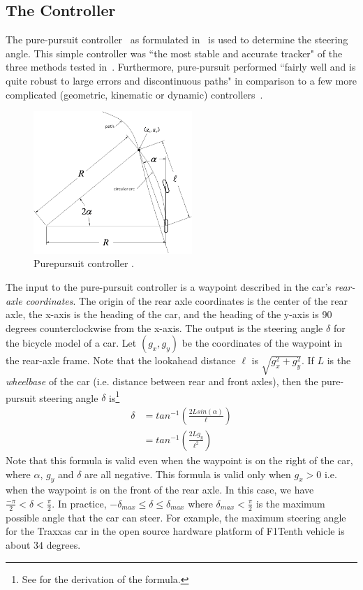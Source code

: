 \subsection{The Controller}
\label{sec:ppcontroller}
The pure-pursuit controller~\cite{Amidi.1991}
as formulated in~\cite{Snider.2009} is used to determine the steering angle.
This simple controller was ``the most stable and accurate tracker"
of the three methods tested in~\cite{Amidi.1991}.
Furthermore, pure-pursuit performed
``fairly well and is quite robust to large errors and discontinuous paths" in comparison to a few more complicated (geometric, kinematic or dynamic) controllers~\cite{Snider.2009}.

\begin{figure}
\centering
\includegraphics[width=60mm]{Figures/Purepursuit.png}%
\caption{Purepursuit controller \cite{Snider.2009}.}
\label{fig:purepursuit}%
\end{figure}

The input to the pure-pursuit controller is a waypoint described in the car's \emph{rear-axle coordinates}.
The origin of the rear axle coordinates is the center of the rear axle, the x-axis is the heading of the car, and the heading of the y-axis is 90 degrees counterclockwise from the x-axis.
The output is the steering angle $\delta$ for the bicycle model of a car.
Let $(g_x, g_y)$ be the coordinates of the waypoint in the rear-axle frame.
Note that the lookahead distance $\ell$ is $\sqrt{g_x^2+g_y^2}$.
If $L$ is the \emph{wheelbase} of the car (i.e. distance between rear and front axles), then the pure-pursuit steering angle $\delta$ is\footnote{See \cite{Snider.2009} for the derivation of the formula.}
\begin{align}
\delta & = tan^{-1}(\frac{2Lsin(\alpha)}{\ell}) \nonumber \\
 & =  tan^{-1}(\frac{2L g_y}{\ell^2})
 \label{eqn:purepursuit}
\end{align}
Note that this formula is valid even when the waypoint is on the right of the car,
where $\alpha$, $g_y$ and $\delta$ are all negative.
This formula is valid only when $g_x > 0$
i.e. when the waypoint is on the front of the rear axle.
In this case,
we have $\frac{-\pi}{2} < \delta < \frac{\pi}{2} $.
In practice,
$-\delta_{max} \leq \delta \leq \delta_{max} $
where $\delta_{max} < \frac{\pi}{2}$ is the maximum possible angle that the car can steer.
For example,
the maximum steering angle for the Traxxas car in the open source hardware platform of F1Tenth vehicle is about $34$ degrees.
